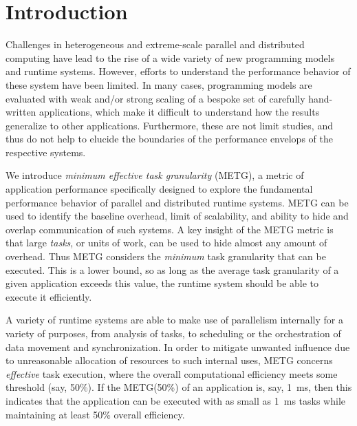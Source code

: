 \section{Introduction}

Challenges in heterogeneous and extreme-scale parallel and distributed
computing have lead to the rise of a wide variety of new programming
models and runtime systems. However, efforts to understand the
performance behavior of these system have been limited. In many cases,
programming models are evaluated with weak and/or strong scaling of a
bespoke set of carefully hand-written applications, which make it
difficult to understand how the results generalize to other
applications. Furthermore, these are not limit studies, and thus do
not help to elucide the boundaries of the performance envelops of the
respective systems.

We introduce \emph{minimum effective task granularity} (METG), a
metric of application performance specifically designed to explore the
fundamental performance behavior of parallel and distributed runtime
systems. METG can be used to identify the baseline overhead, limit of
scalability, and ability to hide and overlap communication of such
systems. A key insight of the METG metric is that large \emph{tasks},
or units of work, can be used to hide almost any amount of
overhead. Thus METG considers the \emph{minimum} task granularity that
can be executed. This is a lower bound, so as long as the average task
granularity of a given application exceeds this value, the runtime
system should be able to execute it efficiently.

A variety of runtime systems are able to make use of parallelism
internally for a variety of purposes, from analysis of tasks, to
scheduling or the orchestration of data movement and
synchronization. In order to mitigate unwanted influence due to
unreasonable allocation of resources to such internal uses, METG
concerns \emph{effective} task execution, where the overall
computational efficiency meets some threshold (say, 50\%). If the
METG(50\%) of an application is, say, 1~ms, then this indicates that
the application can be executed with as small as 1~ms tasks while
maintaining at least 50\% overall efficiency.

